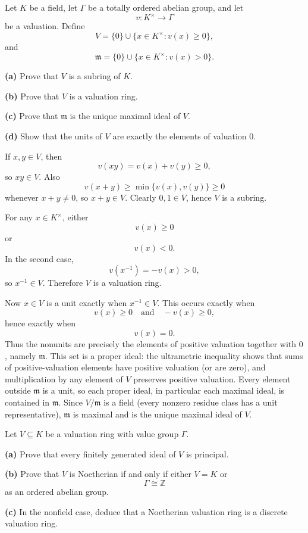 \begin{problem}[CP-V-0036]
\label{prob:cp-v-0036}
Let \(K\) be a field, let \(\Gamma\) be a totally ordered abelian group, and
let
\[
v:K^\times\to\Gamma
\]
be a valuation. Define
\[
V=\{0\}\cup\{x\in K^\times:v(x)\ge0\},
\]
and
\[
\mathfrak m
=
\{0\}\cup\{x\in K^\times:v(x)>0\}.
\]

\textbf{(a)} Prove that \(V\) is a subring of \(K\).

\textbf{(b)} Prove that \(V\) is a valuation ring.

\textbf{(c)} Prove that \(\mathfrak m\) is the unique maximal ideal of \(V\).

\textbf{(d)} Show that the units of \(V\) are exactly the elements of
valuation \(0\).
\end{problem}

\begin{solution}
If \(x,y\in V\), then
\[
v(xy)=v(x)+v(y)\ge0,
\]
so \(xy\in V\). Also
\[
v(x+y)\ge\min\{v(x),v(y)\}\ge0
\]
whenever \(x+y\ne0\), so \(x+y\in V\). Clearly \(0,1\in V\), hence \(V\) is
a subring.

For any \(x\in K^\times\), either
\[
v(x)\ge0
\]
or
\[
v(x)<0.
\]
In the second case,
\[
v(x^{-1})=-v(x)>0,
\]
so \(x^{-1}\in V\). Therefore \(V\) is a valuation ring.

Now \(x\in V\) is a unit exactly when \(x^{-1}\in V\). This occurs exactly
when
\[
v(x)\ge0
\quad\text{and}\quad
-v(x)\ge0,
\]
hence exactly when
\[
v(x)=0.
\]
Thus the nonunits are precisely the elements of positive valuation together
with \(0\), namely \(\mathfrak m\). This set is a proper ideal:
the ultrametric inequality shows that sums of positive-valuation elements
have positive valuation (or are zero), and multiplication by any element
of \(V\) preserves positive valuation. Every element outside
\(\mathfrak m\) is a unit, so each proper ideal, in particular each
maximal ideal, is contained in \(\mathfrak m\). Since
\(V/\mathfrak m\) is a field (every nonzero residue class has a unit
representative), \(\mathfrak m\) is maximal and is the unique
maximal ideal of \(V\).
\end{solution}


\begin{problem}[CP-V-0037]
\label{prob:cp-v-0037}
Let \(V\subseteq K\) be a valuation ring with value group \(\Gamma\).

\textbf{(a)} Prove that every finitely generated ideal of \(V\) is principal.

\textbf{(b)} Prove that \(V\) is Noetherian if and only if either \(V=K\) or
\[
\Gamma\cong\mathbb Z
\]
as an ordered abelian group.

\textbf{(c)} In the nonfield case, deduce that a Noetherian valuation ring is
a discrete valuation ring.
\end{problem}

